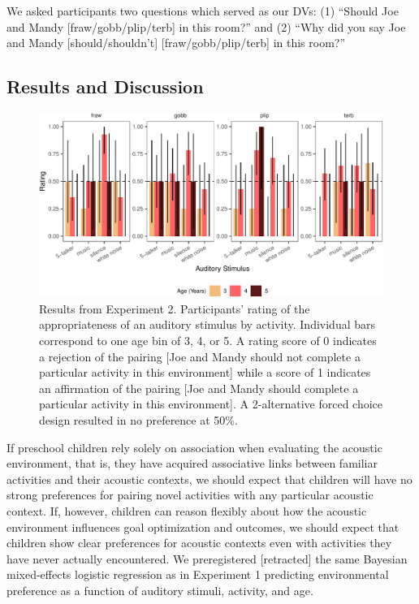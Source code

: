 \documentclass[10pt, letterpaper]{article}
\newenvironment{CodeChunk}{}{}
\begin{document}
We asked participants two questions which served as our DVs: (1)
``Should Joe and Mandy {[}fraw/gobb/plip/terb{]} in this room?'' and (2)
``Why did you say Joe and Mandy {[}should/shouldn't{]}
{[}fraw/gobb/plip/terb{]} in this room?''

\hypertarget{results-and-discussion-1}{%
\subsection{Results and Discussion}\label{results-and-discussion-1}}

\begin{CodeChunk}
\begin{figure}[t]

{\centering \includegraphics{figs/e4b-bar-1} 

}

\caption[Results from Experiment 2]{Results from Experiment 2. Participants' rating of the appropriateness of an auditory stimulus by activity. Individual bars correspond to one age bin of 3, 4, or 5. A rating score of 0 indicates a rejection of the pairing [Joe and Mandy should not complete a particular activity in this environment] while a score of 1 indicates an affirmation of the pairing [Joe and Mandy should complete a particular activity in this environment]. A 2-alternative forced choice design resulted in no preference at 50\%.}\label{fig:e4b-bar}
\end{figure}
\end{CodeChunk}

If preschool children rely solely on association when evaluating the
acoustic environment, that is, they have acquired associative links
between familiar activities and their acoustic contexts, we should
expect that children will have no strong preferences for pairing novel
activities with any particular acoustic context. If, however, children
can reason flexibly about how the acoustic environment influences goal
optimization and outcomes, we should expect that children show clear
preferences for acoustic contexts even with activities they have never
actually encountered. We preregistered {[}retracted{]} the same Bayesian
mixed-effects logistic regression as in Experiment 1 predicting
environmental preference as a function of auditory stimuli, activity,
and age.
\end{document}
